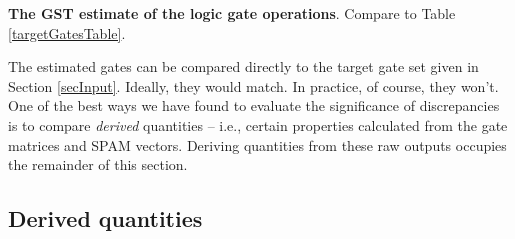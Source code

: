 \documentclass{article}[11pt]
\begin{document}
\begin{table}[h]
\begin{center}
\caption{\textbf{The GST estimate of the logic gate operations}.  Compare to Table \ref{targetGatesTable}.\label{bestGatesetGatesTable}}
\end{center}
\end{table}

The estimated gates can be compared directly to the target gate set given in Section \ref{secInput}.  Ideally, they would match.  In practice, of course, they won't.  One of the best ways we have found to evaluate the significance of discrepancies is to compare \emph{derived} quantities -- i.e., certain properties calculated from the gate matrices and SPAM vectors.  Deriving quantities from these raw outputs occupies the remainder of this section.
\clearpage

\subsection{Derived quantities\label{derivedQtySection}}
\end{document}
